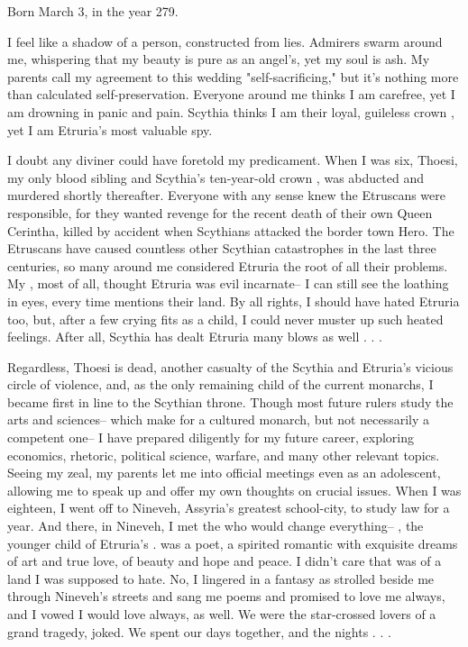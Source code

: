 \documentclass[char]{Kos}
\begin{document}
\name{\cBride{}}

Born March 3, in the year 279.

I feel like a shadow of a person, constructed from lies. Admirers swarm around me, whispering that my beauty is pure as an angel's, yet my soul is ash. My parents call my agreement to this wedding "self-sacrificing," but it's nothing more than calculated self-preservation. Everyone around me thinks I am carefree, yet I am drowning in panic and pain. Scythia thinks I am their loyal, guileless crown \cBride{\prince}, yet I am Etruria's most valuable spy.

I doubt any diviner could have foretold my predicament. When I was six, Thoesi, my only blood sibling and Scythia's ten-year-old crown \cFugitive{\prince}, was abducted and murdered shortly thereafter. Everyone with any sense knew the Etruscans were responsible, for they wanted revenge for the recent death of their own Queen Cerintha, killed by accident when Scythians attacked the border town Hero. The Etruscans have caused countless other Scythian catastrophes in the last three centuries, so many around me considered Etruria the root of all their problems. My \cScythiaQueen{\parent}, most of all, thought Etruria was evil incarnate-- I can still see the loathing in \cScythiaQueen{\their} eyes, every time \cScythiaQueen{\they} mentions their land. By all rights, I should have hated Etruria too, but, after a few crying fits as a child, I could never muster up such heated feelings. After all, Scythia has dealt Etruria many blows as well . . .

Regardless, Thoesi is dead, another casualty of the Scythia and Etruria's vicious circle of violence, and, as the only remaining child of the current monarchs, I became first in line to the Scythian throne. Though most future rulers study the arts and sciences-- which make for a cultured monarch, but not necessarily a competent one-- I have prepared diligently for my future career, exploring economics, rhetoric, political science, warfare, and many other relevant topics. Seeing my zeal, my parents let me into official meetings even as an adolescent, allowing me to speak up and offer my own thoughts on crucial issues. When I was eighteen, I went off to Nineveh, Assyria's greatest school-city, to study law for a year. And there, in Nineveh, I met the \cPoet{\human} who would change everything-- \cPoet{\name}, the younger child of Etruria's \cEtruriaKing{\monarch}. \cPoet{\They} was a poet, a spirited romantic with exquisite dreams of art and true love, of beauty and hope and peace. I didn't care that \cPoet{\they} was \cPoet{\prince} of a land I was supposed to hate. No, I lingered in a fantasy as \cPoet{\they} strolled beside me through Nineveh's streets and sang me poems and promised to love me always, and I vowed I would love \cPoet{\them} always, as well. We were the star-crossed lovers of a grand tragedy, \cPoet{\they} joked. We spent our days together, and the nights . . .
\end{document}
